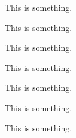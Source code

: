 \documentclass{ximera}
\begin{document}
\begin{paradox}
  This is something.
\end{paradox}

\begin{procedure}
  This is something.
\end{procedure}

\begin{proposition}
  This is something.
\end{proposition}

\begin{remark}
  This is something.
\end{remark}

\begin{summary}
  This is something.
\end{summary}

\begin{template}
  This is something.
\end{template}

\begin{warning}
  This is something.
\end{warning}
\end{document}
